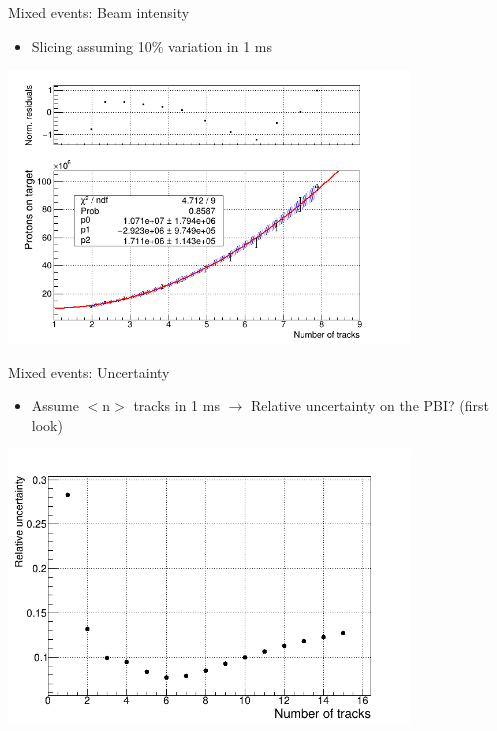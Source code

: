 \documentclass[10pt]{beamer}
\begin{document}
%
\begin{frame}{Mixed events: Beam intensity}
\begin{itemize}
\item Slicing assuming 10\% variation in 1 ms
\end{itemize}
\begin{center}
\includegraphics[width=0.8\textwidth]{plots/mix/pol2-fit}
\end{center}
\end{frame}

%
\begin{frame}{Mixed events: Uncertainty}
\begin{itemize}
\item Assume $<$n$>$ tracks in 1 ms $\rightarrow$ Relative uncertainty on the PBI? (first look)
\end{itemize}
\begin{center}
\includegraphics[width=0.8\textwidth]{plots/mix/uncertainty}
\end{center}
\end{frame}
\end{document}
